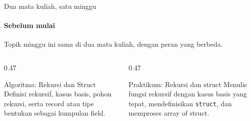 \documentclass[t]{beamer}
\begin{document}

\begin{frame}{Dua mata kuliah, satu minggu}
\framesubtitle{Sebelum mulai}
Topik minggu ini sama di dua mata kuliah, dengan peran yang berbeda.
\vspace{10pt}

\begin{columns}[T]
\begin{column}{0.47\textwidth}
\begin{Blok}{Algoritma: Rekursi dan Struct}
Definisi rekursif, kasus basis, pohon rekursi, serta record atau tipe bentukan sebagai kumpulan field.
\end{Blok}
\end{column}
\begin{column}{0.47\textwidth}
\begin{BlokGelap}{Praktikum: Rekursi dan struct}
Menulis fungsi rekursif dengan kasus basis yang tepat, mendefinisikan \texttt{struct}, dan memproses array of struct.
\end{BlokGelap}
\end{column}
\end{columns}
\end{frame}
\end{document}
